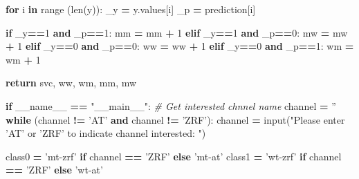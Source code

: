 \documentclass[10pt,letterpaper]{article}
\newenvironment{Shaded}{\begin{snugshade}}{\end{snugshade}}
\newcommand{\KeywordTok}[1]{\textcolor[rgb]{0.13,0.29,0.53}{\textbf{#1}}}
\newcommand{\DecValTok}[1]{\textcolor[rgb]{0.00,0.00,0.81}{#1}}
\newcommand{\StringTok}[1]{\textcolor[rgb]{0.31,0.60,0.02}{#1}}
\newcommand{\CommentTok}[1]{\textcolor[rgb]{0.56,0.35,0.01}{\textit{#1}}}
\newcommand{\VariableTok}[1]{\textcolor[rgb]{0.00,0.00,0.00}{#1}}
\newcommand{\ControlFlowTok}[1]{\textcolor[rgb]{0.13,0.29,0.53}{\textbf{#1}}}
\newcommand{\OperatorTok}[1]{\textcolor[rgb]{0.81,0.36,0.00}{\textbf{#1}}}
\newcommand{\BuiltInTok}[1]{#1}
\newcommand{\NormalTok}[1]{#1}
\begin{document}
\begin{Shaded}
\begin{Highlighting}[]
    \ControlFlowTok{for}\NormalTok{ i }\KeywordTok{in} \BuiltInTok{range}\NormalTok{ (}\BuiltInTok{len}\NormalTok{(y)):}
\NormalTok{        _y }\OperatorTok{=}\NormalTok{ y.values[i]}
\NormalTok{        _p }\OperatorTok{=}\NormalTok{ prediction[i]}

        \ControlFlowTok{if}\NormalTok{ _y}\OperatorTok{==}\DecValTok{1} \KeywordTok{and}\NormalTok{ _p}\OperatorTok{==}\DecValTok{1}\NormalTok{:}
\NormalTok{            mm }\OperatorTok{=}\NormalTok{ mm }\OperatorTok{+} \DecValTok{1}
        \ControlFlowTok{elif}\NormalTok{ _y}\OperatorTok{==}\DecValTok{1} \KeywordTok{and}\NormalTok{ _p}\OperatorTok{==}\DecValTok{0}\NormalTok{:}
\NormalTok{            mw }\OperatorTok{=}\NormalTok{ mw }\OperatorTok{+} \DecValTok{1}
        \ControlFlowTok{elif}\NormalTok{ _y}\OperatorTok{==}\DecValTok{0} \KeywordTok{and}\NormalTok{ _p}\OperatorTok{==}\DecValTok{0}\NormalTok{:}
\NormalTok{            ww }\OperatorTok{=}\NormalTok{ ww }\OperatorTok{+} \DecValTok{1}
        \ControlFlowTok{elif}\NormalTok{ _y}\OperatorTok{==}\DecValTok{0} \KeywordTok{and}\NormalTok{ _p}\OperatorTok{==}\DecValTok{1}\NormalTok{:}
\NormalTok{            wm }\OperatorTok{=}\NormalTok{ wm }\OperatorTok{+} \DecValTok{1}
    
    \ControlFlowTok{return}\NormalTok{ svc, ww, wm, mm, mw}


\ControlFlowTok{if} \VariableTok{__name__} \OperatorTok{==} \StringTok{"__main__"}\NormalTok{:}
    \CommentTok{# Get interested chnnel name}
\NormalTok{    channel }\OperatorTok{=} \StringTok{''}
    \ControlFlowTok{while}\NormalTok{ (channel }\OperatorTok{!=} \StringTok{'AT'} \KeywordTok{and}\NormalTok{ channel }\OperatorTok{!=} \StringTok{'ZRF'}\NormalTok{):}
\NormalTok{        channel }\OperatorTok{=} \BuiltInTok{input}\NormalTok{(}\StringTok{"Please enter 'AT' or 'ZRF' to indicate channel interested: "}\NormalTok{)}
    
\NormalTok{    class0 }\OperatorTok{=} \StringTok{'mt-zrf'} \ControlFlowTok{if}\NormalTok{ channel }\OperatorTok{==} \StringTok{'ZRF'} \ControlFlowTok{else} \StringTok{'mt-at'}
\NormalTok{    class1 }\OperatorTok{=} \StringTok{'wt-zrf'} \ControlFlowTok{if}\NormalTok{ channel }\OperatorTok{==} \StringTok{'ZRF'} \ControlFlowTok{else} \StringTok{'wt-at'}


\end{Highlighting}
\end{Shaded}
\end{document}
